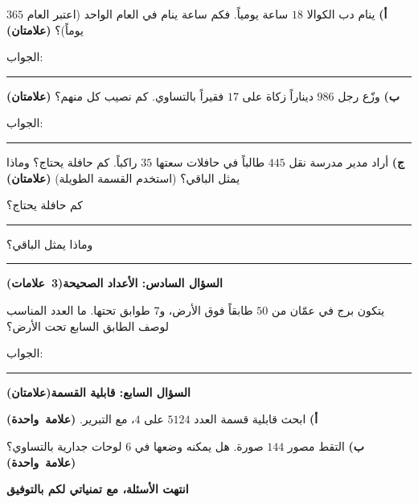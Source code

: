 \documentclass[12pt, a4paper]{article}
\newcommand{\question}[2]{%
  \par\vspace{0.2cm}\noindent
  \colorbox{gray!15}{\parbox{\dimexpr\linewidth-2\fboxsep\relax}{\textbf{\large #1}\hfill\mbox{\textbf{(#2)}}}}%
  \par\vspace{0.12cm}}
\newcommand{\pts}[1]{\hfill\mbox{\textbf{(#1)}}}
\newcommand{\blank}[1][5cm]{\rule{#1}{0.4pt}}
\begin{document}
\noindent
\begin{minipage}[t]{0.48\linewidth}
\textbf{أ)} ينام دب الكوالا $18$ ساعة يومياً. فكم ساعة ينام في العام الواحد (اعتبر العام $365$ يوماً)؟ \pts{علامتان}
\par\vspace{2.5cm}
الجواب: \blank[4.5cm]
\end{minipage}\hfill\vrule\hfill
\begin{minipage}[t]{0.48\linewidth}
\textbf{ب)} وزّع رجل $986$ ديناراً زكاة على $17$ فقيراً بالتساوي. كم نصيب كل منهم؟ \pts{علامتان}
\par\vspace{2.5cm}
الجواب: \blank[4.5cm]
\end{minipage}

\vspace{0.35cm}
\textbf{ج)} أراد مدير مدرسة نقل $445$ طالباً في حافلات سعتها $35$ راكباً. كم حافلة يحتاج؟ وماذا يمثل الباقي؟ (استخدم القسمة الطويلة) \pts{علامتان}
\par\vspace{2.4cm}
كم حافلة يحتاج؟ \blank[4cm] \hfill وماذا يمثل الباقي؟ \blank[5.5cm]

\vspace{0.2cm}
\noindent
\begin{minipage}[t]{0.48\linewidth}
\question{السؤال السادس: الأعداد الصحيحة}{3 علامات}
يتكون برج في عمّان من $50$ طابقاً فوق الأرض، و$7$ طوابق تحتها. ما العدد المناسب لوصف الطابق السابع تحت الأرض؟
\par\vspace{1.4cm}
الجواب: \blank[4.5cm]
\end{minipage}\hfill\vrule\hfill
\begin{minipage}[t]{0.48\linewidth}
\question{السؤال السابع: قابلية القسمة}{علامتان}
\textbf{أ)} ابحث قابلية قسمة العدد $5124$ على $4$، مع التبرير. \pts{علامة واحدة}
\par\vspace{1.3cm}
\textbf{ب)} التقط مصور $144$ صورة. هل يمكنه وضعها في $6$ لوحات جدارية بالتساوي؟ \pts{علامة واحدة}
\par\vspace{1.1cm}
\end{minipage}

\vfill
\begin{center}
\vspace{-0.3cm}
\textbf{\large انتهت الأسئلة، مع تمنياتي لكم بالتوفيق}
\end{center}
\end{document}
